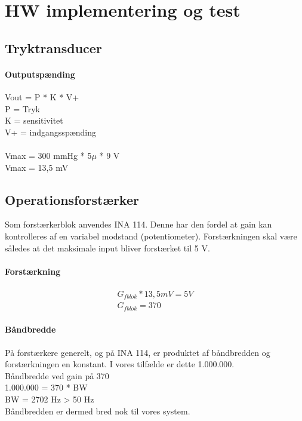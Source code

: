 \chapter{HW implementering og test}



\section{Tryktransducer}
\subsubsection{Outputspænding} 
Vout = P * K * V+
\\
P = Tryk\\K = sensitivitet\\V+ = indgangsspænding\\ \\

Vmax = 300 mmHg * 5$\mu$ * 9 V\\
Vmax = 13,5 mV


\section{Operationsforstærker}
Som forstærkerblok anvendes INA 114. Denne har den fordel at gain kan kontrolleres af en variabel modstand (potentiometer). Forstærkningen skal være således at det maksimale input bliver forstærket til 5 V. 
\subsubsection{Forstærkning}
\begin{align}
G_{fblok} * 13,5 mV = 5 V\\
G_{fblok} = 370	
\end{align}

\subsubsection{Båndbredde}
På forstærkere generelt, og på INA 114, er produktet af båndbredden og forstærkningen en konstant. I vores tilfælde er dette 1.000.000.\\
Båndbredde ved gain på 370\\
1.000.000 = 370 * BW\\
BW = 2702 Hz > 50 Hz\\
Båndbredden er dermed bred nok til vores system.
